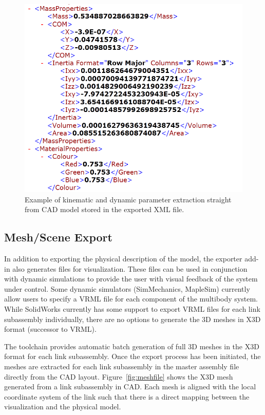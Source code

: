 \begin{figure}[!h]
	\centering
    \includegraphics[scale=0.6]{fig/toolchain/exportfile.png}
  	\caption{Example of kinematic and dynamic parameter extraction straight from CAD model stored in the exported XML file.}
	\label{fig:exportfile}
\end{figure}


\subsection{Mesh/Scene Export} %
\label{sub:mesh_scene_export}
In addition to exporting the physical description of the model, the exporter add-in also generates files for visualization. These files can be used in conjunction with dynamic simulations to provide the user with visual feedback of the system under control. Some dynamic simulators (SimMechanics, MapleSim) currently allow users to specify a VRML file for each component of the multibody system. While SolidWorks currently has some support to export VRML files for each link subassembly individually, there are no options to generate the 3D meshes in X3D format (successor to VRML).

The toolchain provides automatic batch generation of full 3D meshes in the X3D format for each link subassembly. Once the export process has been initiated, the meshes are extracted for each link subassembly in the master assembly file directly from the CAD layout. Figure~\ref{fig:meshfile} shows the X3D mesh generated from a link subassembly in CAD. Each mesh is aligned with the local coordinate system of the link such that there is a direct mapping between the visualization and the physical model.

